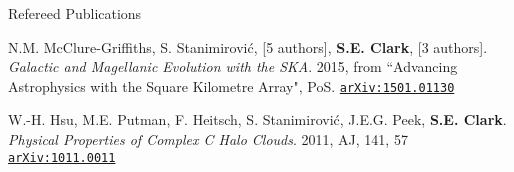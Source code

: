 \documentclass{resume_clark} %
\begin{document}
\begin{rSection}{Refereed Publications}
\begin{etaremune}
\item N.M. McClure-Griffiths, S. Stanimirovi\' c, [5 authors], {\bf S.E. Clark}, [3 authors]. \textit{Galactic and Magellanic Evolution with the SKA}. 2015, from ``Advancing Astrophysics with the Square Kilometre Array", PoS. \href{http://arxiv.org/abs/1501.01130}{\tt arXiv:1501.01130}

\item W.-H. Hsu, M.E. Putman, F. Heitsch, S. Stanimirovi\' c, J.E.G. Peek, {\bf S.E. Clark}. {\em Physical Properties of Complex C Halo Clouds}. 2011, {AJ, 141, 57} \href{https://arxiv.org/abs/1011.0011}{\tt arXiv:1011.0011}\\
\end{etaremune}

\end{rSection}
\end{document}
